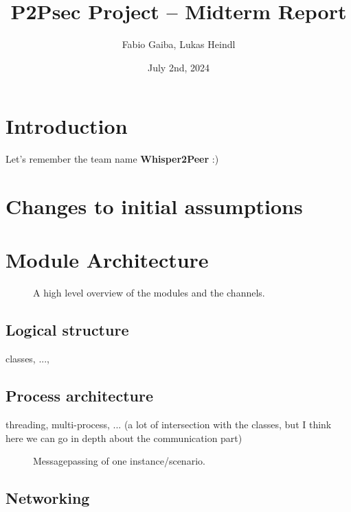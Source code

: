 \documentclass[a4paper,english,10pt,NET]{tumarticle}
\title{P2Psec Project -- Midterm Report}
\author{Fabio Gaiba, Lukas Heindl}
\date{July 2nd, 2024}
\begin{document}
\maketitle
\thispagestyle{tumarticle}

\section{Introduction}

Let's remember the team name \textbf{Whisper2Peer} :)

\section{Changes to initial assumptions}

\section{Module Architecture}

\begin{figure}
	\centering
	
	\caption{A high level overview of the modules and the channels.}
	\label{fig:overview}
\end{figure}

\subsection{Logical structure}

classes, ..., 

% 	

\subsection{Process architecture}

threading, multi-process, ... (a lot of intersection with the classes, but I think here we can go in depth about the communication part)

\begin{figure}
	\centering
	
	\caption{Messagepassing of one instance/scenario.}
	\label{fig:msg}
\end{figure}

\subsection{Networking} 
\end{document}
